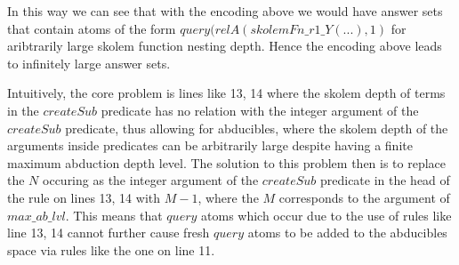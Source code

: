 \documentclass{article}
\begin{document}
In this way we can see that with the encoding above we would have answer sets that contain atoms of the form $query(relA(skolemFn\_r1\_Y(...),1)$ for aribtrarily large skolem function nesting depth. Hence the encoding above leads to infinitely large answer sets.

Intuitively, the core problem is lines like 13, 14 where the skolem depth of terms in the $createSub$ predicate has no relation with the integer argument of the $createSub$ predicate, thus allowing for abducibles, where the skolem depth of the arguments inside predicates can be arbitrarily large despite having a finite maximum abduction depth level. The solution to this problem then is to replace the $N$ occuring as the integer argument of the $createSub$ predicate in the head of the rule on lines 13, 14 with $M-1$, where the $M$ corresponds to the argument of $max\_ab\_lvl$. This means that $query$ atoms which occur due to the use of rules like line 13, 14 cannot further cause fresh $query$ atoms to be added to the abducibles space via rules like the one on line 11.
\end{document}
